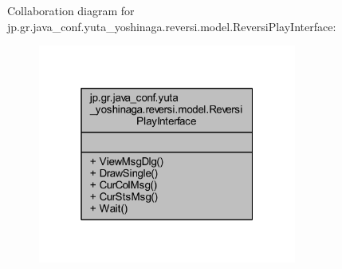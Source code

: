 Collaboration diagram for jp.\+gr.\+java\+\_\+conf.\+yuta\+\_\+yoshinaga.\+reversi.\+model.\+Reversi\+Play\+Interface\+:\nopagebreak
\begin{figure}[H]
\begin{center}
\leavevmode
\includegraphics[width=241pt]{interfacejp_1_1gr_1_1java__conf_1_1yuta__yoshinaga_1_1reversi_1_1model_1_1_reversi_play_interface__coll__graph}
\end{center}
\end{figure}
